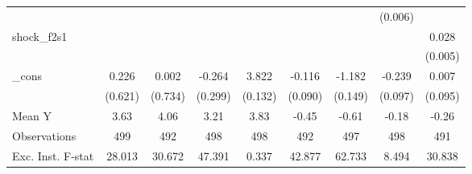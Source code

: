 {\begin{tabular}{l*{8}{c}}
            &                     &                     &                     &                     &                     &                     &     (0.006)         &                     \\
\addlinespace
shock\_f2s1  &                     &                     &                     &                     &                     &                     &                     &       0.028\sym{***}\\
            &                     &                     &                     &                     &                     &                     &                     &     (0.005)         \\
\addlinespace
\_cons      &       0.226         &       0.002         &      -0.264         &       3.822\sym{***}&      -0.116         &      -1.182\sym{***}&      -0.239\sym{**} &       0.007         \\
            &     (0.621)         &     (0.734)         &     (0.299)         &     (0.132)         &     (0.090)         &     (0.149)         &     (0.097)         &     (0.095)         \\
\midrule
Mean Y      &        3.63         &        4.06         &        3.21         &        3.83         &       -0.45         &       -0.61         &       -0.18         &       -0.26         \\
Observations&         499         &         492         &         498         &         498         &         492         &         497         &         498         &         491         \\
Exc. Inst. F-stat&      28.013         &      30.672         &      47.391         &       0.337         &      42.877         &      62.733         &       8.494         &      30.838         \\
\bottomrule
\end{tabular}
}
